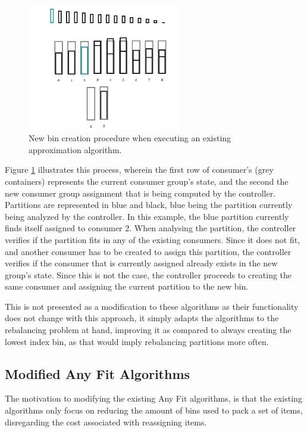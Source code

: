 \begin{figure}[H] 
\centering
\includegraphics[width=0.6\textwidth]{images/controller/ApproximationAlgorithm_NewBin.png}
\caption{
    New bin creation procedure when executing an existing approximation algorithm.
}
\label{fig:approximation_bin_creation} 
\end{figure}

Figure \ref{fig:approximation_bin_creation} illustrates this process, wherein
the first row of consumer's (grey containers) represents the current consumer
group's state, and the second the new consumer group assignment that is being
computed by the controller. Partitions are represented in blue and black, blue
being the partition currently being analyzed by the controller. In this example,
the blue partition currently finds itself assigned to consumer 2. When analysing
the partition, the controller verifies if the partition fits in any of the
existing consumers. Since it does not fit, and another consumer has to be
created to assign this partition, the controller verifies if the consumer that
is currently assigned already exists in the new group's state. Since this is not
the case, the controller proceeds to creating the same consumer and assigning
the current partition to the new bin.

This is not presented as a modification to these algorithms as their
functionality does not change with this approach, it simply adapts the
algorithms to the rebalancing problem at hand, improving it as compared to
always creating the lowest index bin, as that would imply rebalancing partitions
more often.

\subsection{Modified Any Fit Algorithms}
\label{subsub:modified_any_fit}

The motivation to modifying the existing Any Fit algorithms, is that the
existing algorithms only focus on reducing the amount of bins used to pack
a set of items, disregarding the cost associated with reassigning items.

